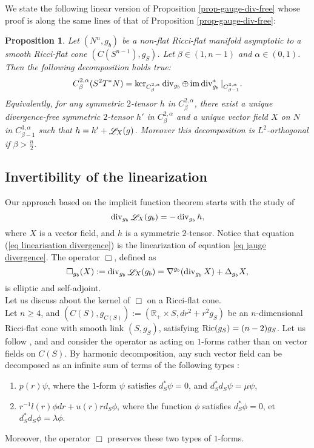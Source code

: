 \documentclass[a4paper,11pt,reqno]{amsart}
\newtheorem{prop}[defn]{Proposition}
\def\Ric{\mathop{\rm Ric}\nolimits}
\def\div{\mathop{\rm div}\nolimits}
\def\ima{\mathop{\rm Im}\nolimits}
\def\Li{\mathop{\rm \mathscr{L}}\nolimits}
\def\Ric{\mathop{\rm Ric}\nolimits}
\def\div{\mathop{\rm div}\nolimits}
\def\ima{\mathop{\rm Im}\nolimits}
\def\Li{\mathop{\rm \mathscr{L}}\nolimits}
\def\ima{\mathop{\rm im}\nolimits}
\numberwithin{equation}{section}
\begin{document}
	We state the following linear version of Proposition \ref{prop-gauge-div-free} whose proof is along the same lines of that of Proposition \ref{prop-gauge-div-free}:
	\begin{prop}\label{prop-decomp-2-tensor}
		Let $(N^n,g_b)$ be a non-flat Ricci-flat manifold asymptotic to a smooth Ricci-flat cone $(C(S^{n-1}),g_S)$. Let $\beta\in (1,n-1)$ and $\alpha\in(0,1)$. Then  the following decomposition holds true:
\begin{equation}
C^{2,\alpha}_{\beta}(S^2T^*N)=\ker_{C^{2,\alpha}_{\beta}}\div_{g_b}\oplus\ima \div^{\ast}_{g_b}|_{C^{3,\alpha}_{\beta-1}}.
\end{equation}
Equivalently, for any symmetric $2$-tensor $h$ in $C^{2,\alpha}_{\beta}$, there exist a unique divergence-free symmetric $2$-tensor $h'$ in $C^{2,\alpha}_{\beta}$ and a unique vector field $X$ on $N$ in $C^{3,\alpha}_{\beta-1}$ such that $h=h'+\Li_X(g)$. Moreover this decomposition is $L^2$-orthogonal if $\beta>\frac{n}{2}$.
\end{prop}
	
	\subsection{Invertibility of the linearization}\label{inv-lin-section}
	
	Our approach based on the implicit function theorem starts with the study of 
	\begin{equation}
	\div_{g_b}\Li_{X}(g_b) = - \div_{g_b} h,\label{eq linearisation divergence}
	\end{equation}
	where $X$ is a vector field, and $h$ is a symmetric $2$-tensor. Notice that equation (\ref{eq linearisation divergence}) is the linearization of equation \eqref{eq jauge divergence}. The operator $\Box$, defined as
	\begin{equation}
	\Box_{g_b}(X):=\div_{g_b}\Li_{X}(g_b)=\nabla^{g_b}(\div_{g_b}X)+\Delta_{g_b}X, 
	\end{equation}
	is elliptic and self-adjoint.\\
	
	Let us discuss about the kernel of $\Box$ on a Ricci-flat cone.\\
	
	Let $n\geq 4$, and $(C(S),g_{C(S)}):=(\mathbb{R}_{+}\times S,dr^2+r^2g_S)$ be an $n$-dimensional Ricci-flat cone with smooth link $(S,g_S)$, satisfying $\Ric(g_S)=(n-2)g_S$. Let us follow \cite[Section 2]{Che-Tian-Ric-Fla}, and \cite[Section 4.1]{Ache-Via} and consider the operator as acting on $1$-forms rather than on vector fields on $C(S)$. By harmonic decomposition, any such vector field can be decomposed as an infinite sum of terms of the following types :
	\begin{enumerate}
		\item $p(r)\psi$, where the $1$-form $\psi$ satisfies $d^*_S\psi = 0$, and $d^*_Sd_S\psi = \mu \psi$,
		\item $r^{-1}l(r)\phi dr + u(r)r d_S \phi$, where the function $\phi$ satisfies $d^*_S\phi = 0$, et $d^*_Sd_S\phi = \lambda \phi$.
	\end{enumerate}
	Moreover, the operator $\Box$ preserves these two types of $1$-forms. 
	
\end{document}
